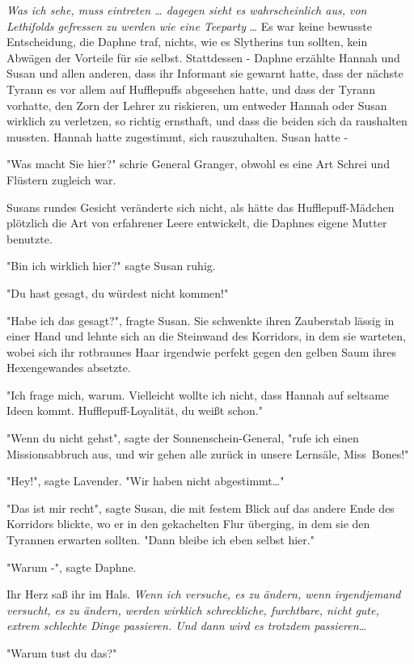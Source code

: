 {\emph{Was ich sehe, muss eintreten … dagegen sieht es wahrscheinlich aus, von Lethifolds gefressen zu werden wie eine Teeparty} … Es war keine bewusste Entscheidung, die Daphne traf, nichts, wie es Slytherins tun sollten, kein Abwägen der Vorteile für sie selbst. Stattdessen - Daphne erzählte Hannah und Susan und allen anderen, dass ihr Informant sie gewarnt hatte, dass der nächste Tyrann es vor allem auf Hufflepuffs abgesehen hatte, und dass der Tyrann vorhatte, den Zorn der Lehrer zu riskieren, um entweder Hannah oder Susan wirklich zu verletzen, so richtig ernsthaft, und dass die beiden sich da raushalten mussten. Hannah hatte zugestimmt, sich rauszuhalten. Susan hatte -

"Was macht Sie hier?" schrie General Granger, obwohl es eine Art Schrei und Flüstern zugleich war.

Susans rundes Gesicht veränderte sich nicht, als hätte das Hufflepuff-Mädchen plötzlich die Art von erfahrener Leere entwickelt, die Daphnes eigene Mutter benutzte.

"Bin ich wirklich hier?" sagte Susan ruhig.

"Du hast gesagt, du würdest nicht kommen!"

"Habe ich das gesagt?", fragte Susan. Sie schwenkte ihren Zauberstab lässig in einer Hand und lehnte sich an die Steinwand des Korridors, in dem sie warteten, wobei sich ihr rotbraunes Haar irgendwie perfekt gegen den gelben Saum ihres Hexengewandes absetzte.

"Ich frage mich, warum. Vielleicht wollte ich nicht, dass Hannah auf seltsame Ideen kommt. Hufflepuff-Loyalität, du weißt schon."

"Wenn du nicht gehst", sagte der Sonnenschein-General, "rufe ich einen Missionsabbruch aus, und wir gehen alle zurück in unsere Lernsäle, Miss~Bones!"

"Hey!", sagte Lavender. "Wir haben nicht abgestimmt…"

"Das ist mir recht", sagte Susan, die mit festem Blick auf das andere Ende des Korridors blickte, wo er in den gekachelten Flur überging, in dem sie den Tyrannen erwarten sollten. "Dann bleibe ich eben selbst hier."

"Warum -", sagte Daphne.

Ihr Herz saß ihr im Hals. \emph{Wenn ich versuche, es zu ändern, wenn irgendjemand versucht, es zu ändern, werden wirklich schreckliche, furchtbare, nicht gute, extrem schlechte Dinge passieren. Und dann wird es trotzdem passieren…}

"Warum tust du das?"

}
